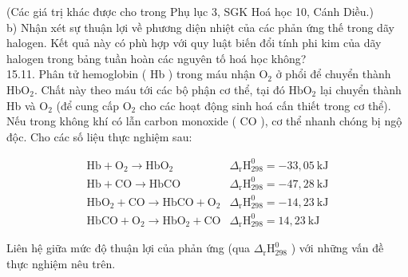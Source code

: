 \documentclass[10pt]{article}
\begin{document}
(Các giá trị khác được cho trong Phụ lục 3, SGK Hoá học 10, Cánh Diều.)\\
b) Nhận xét sự thuận lợi về phương diện nhiệt của các phản ứng thế trong dãy halogen. Kết quả này có phù hợp với quy luật biến đổi tính phi kim của dãy halogen trong bảng tuần hoàn các nguyên tố hoá học không?\\
15.11. Phân tử hemoglobin ( Hb ) trong máu nhận $\mathrm{O}_{2}$ ở phổi để chuyển thành $\mathrm{HbO}_{2}$. Chất này theo máu tới các bộ phận cơ thể, tại đó $\mathrm{HbO}_{2}$ lại chuyển thành Hb và $\mathrm{O}_{2}$ (để cung cấp $\mathrm{O}_{2}$ cho các hoạt động sinh hoá cấn thiết trong cơ thể). Nếu trong không khí có lẫn carbon monoxide ( CO ), cơ thể nhanh chóng bị ngộ độc. Cho các số liệu thực nghiệm sau:

$$
\begin{array}{ll}
\mathrm{Hb}+\mathrm{O}_{2} \rightarrow \mathrm{HbO}_{2} & \Delta_{\mathrm{r}} \mathrm{H}_{298}^{0}=-33,05 \mathrm{~kJ} \\
\mathrm{Hb}+\mathrm{CO} \rightarrow \mathrm{HbCO} & \Delta_{\mathrm{r}} \mathrm{H}_{298}^{0}=-47,28 \mathrm{~kJ} \\
\mathrm{HbO}_{2}+\mathrm{CO} \rightarrow \mathrm{HbCO}+\mathrm{O}_{2} & \Delta_{\mathrm{r}} \mathrm{H}_{298}^{0}=-14,23 \mathrm{~kJ} \\
\mathrm{HbCO}+\mathrm{O}_{2} \rightarrow \mathrm{HbO}_{2}+\mathrm{CO} & \Delta_{\mathrm{r}} \mathrm{H}_{298}^{0}=14,23 \mathrm{~kJ}
\end{array}
$$

Liên hệ giữa mức độ thuận lợi của phản ứng (qua $\Delta_{\mathrm{r}} \mathrm{H}_{298}^{0}$ ) với những vấn đề thực nghiệm nêu trên.
\end{document}
